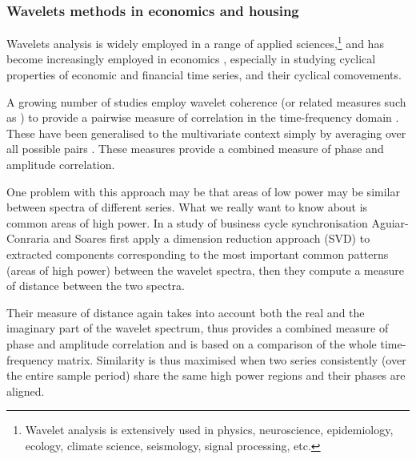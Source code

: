 \documentclass[11pt]{article}
\begin{document}


\subsubsection{Wavelets methods in economics and housing}

Wavelets analysis is widely employed in a range of applied sciences,\footnote{Wavelet analysis is extensively used in physics, neuroscience, epidemiology, ecology, climate science, seismology, signal processing, etc.} and has become increasingly employed in economics \citep{Crowley2007,Soares2011,Aguiar-Conraria2014,Gallegati2014}, especially in studying cyclical properties of economic and financial time series, and their cyclical comovements.




A growing number of studies employ wavelet coherence (or related measures such as \textit{} \citep{Rua2010}) to provide a pairwise measure of correlation in the time-frequency domain \citep{Crowley2008,Aloui2014,Reboredo2017,Klarl2016,Li2015,EuropeanCentralBank-WorkingGrouponEconometricModelling2018,Flor2017,Aguiar-Conraria2011}. These have been generalised to the multivariate context simply by averaging over all possible pairs \citep{Rua2012,Kurowski2018}. These measures provide a combined measure of phase and amplitude correlation.

One problem with this approach may be that areas of low power may be similar between spectra of different series. %
What we really want to know about is common areas of high power. In a study of business cycle synchronisation Aguiar-Conraria and Soares \citep{Aguiar-Conraria2011} first apply a dimension reduction approach (SVD) to extracted components corresponding to the most important common patterns (areas of high power) between the wavelet spectra, then they compute a measure of distance between the two spectra.

Their measure of distance again takes into account both the real and the imaginary part of the wavelet spectrum, thus provides a combined measure of phase and amplitude correlation %
and is based on a comparison of the whole time-frequency matrix. Similarity is thus maximised when two series consistently (over the entire sample period) share the same high power regions and their phases are aligned.%
\end{document}
